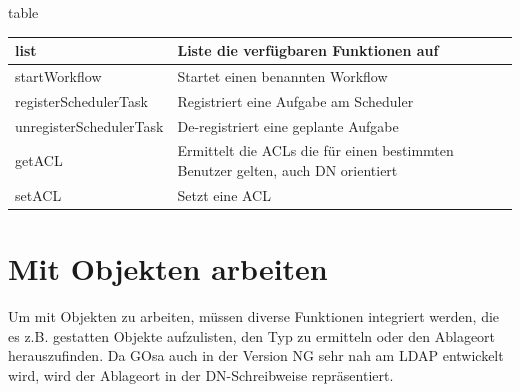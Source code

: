\begin{nofloat}{table}
 \begin{center}
  \begin{tabularx}{\textwidth}[]{|X|X|}
   \hline
   list             & Liste die verfügbaren Funktionen auf\\
   \hline
   startWorkflow    & Startet einen benannten Workflow\\
   \hline
   registerSchedulerTask    & Registriert eine Aufgabe am Scheduler\\
   \hline
   unregisterSchedulerTask  & De-registriert eine geplante Aufgabe\\
   \hline
   getACL            & Ermittelt die ACLs die für einen bestimmten Benutzer gelten, auch DN orientiert\\
   \hline
   setACL            & Setzt eine ACL\\
   \hline
  \end{tabularx}
 \end{center}
\end{nofloat}


\section{Mit Objekten arbeiten}

Um mit Objekten zu arbeiten, müssen diverse Funktionen integriert werden, die es z.B. gestatten 
Objekte aufzulisten, den Typ zu ermitteln oder den Ablageort herauszufinden. Da GOsa auch in der
Version NG sehr nah am LDAP entwickelt wird, wird der Ablageort in der DN-Schreibweise repräsentiert.

